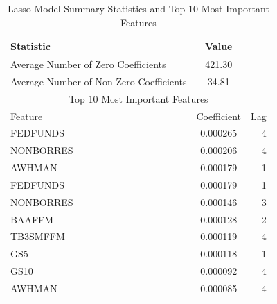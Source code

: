 \begin{table}[H]
\centering
\caption{Lasso Model Summary Statistics and Top 10 Most Important Features} \label{tab:lasso}
\begin{tabular}{lcr}
\toprule
Statistic & Value & \\
\midrule
Average Number of Zero Coefficients & 421.30 & \\
Average Number of Non-Zero Coefficients & 34.81 & \\
\midrule
\multicolumn{3}{c}{Top 10 Most Important Features} \\
\midrule
Feature & Coefficient & Lag \\
\midrule
FEDFUNDS & 0.000265 & 4 \\
NONBORRES & 0.000206 & 4 \\
AWHMAN & 0.000179 & 1 \\
FEDFUNDS & 0.000179 & 1 \\
NONBORRES & 0.000146 & 3 \\
BAAFFM & 0.000128 & 2 \\
TB3SMFFM & 0.000119 & 4 \\
GS5 & 0.000118 & 1 \\
GS10 & 0.000092 & 4 \\
AWHMAN & 0.000085 & 4 \\
\bottomrule
\end{tabular}
\end{table}

